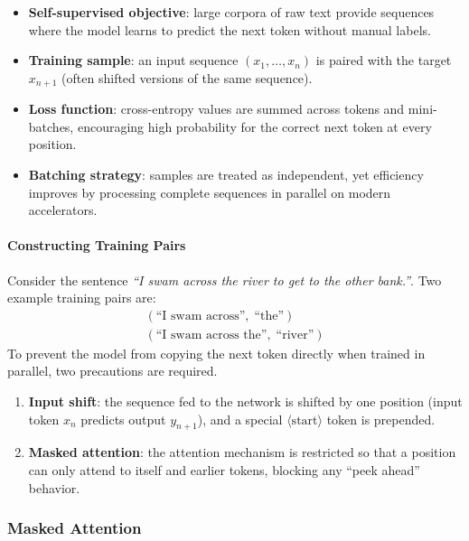 \documentclass[11pt,a4paper]{article}
\theoremstyle{definition}
\theoremstyle{plain}
\theoremstyle{remark}
\begin{document}
\begin{itemize}
    \item \textbf{Self-supervised objective}: large corpora of raw text provide sequences where the model learns to predict the next token without manual labels.
    \item \textbf{Training sample}: an input sequence $(x_1, \ldots, x_n)$ is paired with the target $x_{n+1}$ (often shifted versions of the same sequence).
    \item \textbf{Loss function}: cross-entropy values are summed across tokens and mini-batches, encouraging high probability for the correct next token at every position.
    \item \textbf{Batching strategy}: samples are treated as independent, yet efficiency improves by processing complete sequences in parallel on modern accelerators.
\end{itemize}

\paragraph{Constructing Training Pairs}

Consider the sentence \textit{``I swam across the river to get to the other bank.''}. Two example training pairs are:
\begin{align*}
    (\text{``I swam across''},\; \text{``the''}) \\
    (\text{``I swam across the''},\; \text{``river''})
\end{align*}
To prevent the model from copying the next token directly when trained in parallel, two precautions are required.

\begin{tcolorbox}[colback=orange!7!white,colframe=orange!75!black,title=\textbf{Parallel Training Precautions}]
\begin{enumerate}
    \item \textbf{Input shift}: the sequence fed to the network is shifted by one position (input token $x_n$ predicts output $y_{n+1}$), and a special $\langle\text{start}\rangle$ token is prepended.
    \item \textbf{Masked attention}: the attention mechanism is restricted so that a position can only attend to itself and earlier tokens, blocking any ``peek ahead'' behavior.
\end{enumerate}
\end{tcolorbox}

\subsubsection{Masked Attention}
\end{document}
